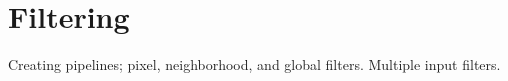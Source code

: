 \chapter{Filtering}

Creating pipelines; pixel, neighborhood, and global filters. Multiple input filters.

